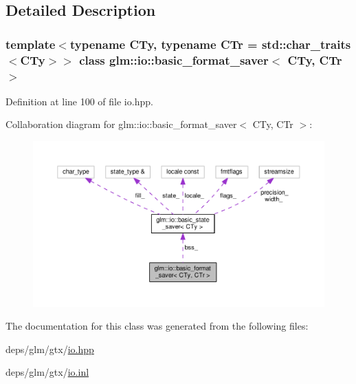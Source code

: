 \subsection{Detailed Description}
\subsubsection*{template$<$typename C\+Ty, typename C\+Tr = std\+::char\+\_\+traits$<$\+C\+Ty$>$$>$\newline
class glm\+::io\+::basic\+\_\+format\+\_\+saver$<$ C\+Ty, C\+Tr $>$}



Definition at line 100 of file io.\+hpp.



Collaboration diagram for glm\+:\+:io\+:\+:basic\+\_\+format\+\_\+saver$<$ C\+Ty, C\+Tr $>$\+:
\nopagebreak
\begin{figure}[H]
\begin{center}
\leavevmode
\includegraphics[width=350pt]{d2/df3/classglm_1_1io_1_1basic__format__saver__coll__graph}
\end{center}
\end{figure}


The documentation for this class was generated from the following files\+:\begin{DoxyCompactItemize}
\item 
deps/glm/gtx/\hyperlink{io_8hpp}{io.\+hpp}\item 
deps/glm/gtx/\hyperlink{io_8inl}{io.\+inl}\end{DoxyCompactItemize}
